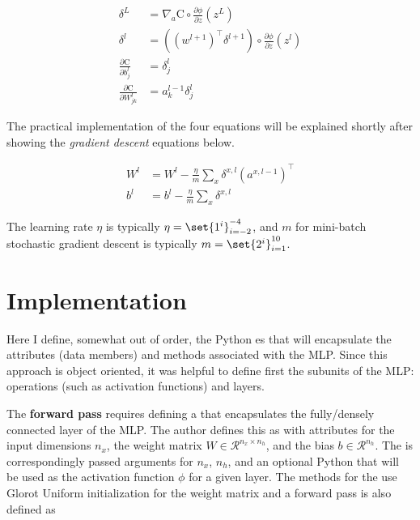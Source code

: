 \documentclass{article}
\DeclarePairedDelimiter\set\{\}
\begin{document}
\begin{align}
	\delta^{L}                                    & = \nabla_{a} \text{C} \circ \frac{\partial \phi}{\partial z}(z^{L})             \\
	\delta^{l}                                    & = ((w^{l+1})^{\top} \delta^{l+1}) \circ \frac{\partial \phi}{\partial z}(z^{l}) \\
	\frac{\partial \text{C}}{\partial b_j^{l}}    & = \delta_j^{l}                                                                  \\
	\frac{\partial \text{C}}{\partial W_{jk}^{l}} & = a_{k}^{l-1}\delta_{j}^{l}
\end{align}

The practical implementation of the four equations will be explained shortly
after showing the \textit{gradient descent} equations below.

\begin{align}
	W^{l} & = W^{l} - \frac{\eta}{m} \sum_{x}{\delta^{x, l}(a^{x, l-1})^\top} \\
	b^{l} & = b^{l} - \frac{\eta}{m} \sum_{x}{\delta^{x, l}}
\end{align}

The learning rate $\eta$ is typically $\eta = \set{1^{i}}_{i=-2}^{-4}$, and $m$
for mini-batch stochastic gradient descent is typically
$m = \set{2^{i}}_{i=1}^{10}$.

\section{Implementation}
Here I define, somewhat out of order, the Python es
that will encapsulate the attributes (data members) and methods associated
with the MLP. Since this approach is object oriented, it was helpful to
define first the subunits of the MLP: operations (such as activation functions)
and layers.

The \textbf{forward pass} requires defining a  that
encapsulates the fully/densely connected layer of the MLP. The author defines this as
 with attributes for the input dimensions $n_x$,
the weight matrix $W \in \mathcal{R}^{n_x \times n_h}$, and the bias
$b \in \mathcal{R}^{n_h}$. The  is correspondingly passed
arguments for $n_x$, $n_h$, and an optional Python 
that will be used as the activation function $\phi$ for a given layer.
The methods for the  use Glorot Uniform initialization \cite{Glorot2010}
for the weight matrix and a forward pass is also defined as
\end{document}
